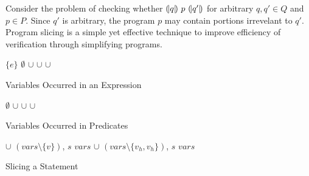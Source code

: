 
Consider the problem of checking whether ${(\!|}{q}{|\!)}~{p}~{(\!|}{q'}{|\!)}$ for
arbitrary $q, q' \in Q$ and $p \in P$. Since $q'$ is arbitrary, the
program $p$ may contain portions irrevelant to $q'$. Program slicing
is a simple yet effective technique to improve efficiency of
verification through simplifying programs.  

\begin{algorithm}
  \begin{algorithmic}[1]
        \Return $\{ e \}$
      \EndCase
        \Return $\emptyset$
      \EndCase
        \Return {}
      \EndCase
        \Return {} $\cup$ 
      \EndCase
        \Return {} $\cup$ 
      \EndCase
        \Return {} $\cup$ 
      \EndCase
        \Return {}
      \EndCase
    \EndMatch
    \EndFunction
  \end{algorithmic}
  \caption{Variables Occurred in an Expression}
\end{algorithm}

\begin{algorithm}
\begin{algorithmic}[1]
    \Case{$\top$}
      $\emptyset$
    \EndCase
      \Return {} $\cup$ 
    \EndCase
      \Return {} $\cup$ 
    \EndCase
      \Return {} $\cup$ 
    \EndCase
  \EndMatch
  \EndFunction
\end{algorithmic}
\caption{Variables Occurred in Predicates}
\end{algorithm}

\begin{algorithm}
  \begin{algorithmic}[1]
          {\Return {} $\cup$ $(\mathit{vars} \setminus \{
            v \})$, $s$}
          {\Return $\mathit{vars}$}
      \EndCase
          {\Return {} $\cup$ $(\mathit{vars} \setminus \{
            v_h, v_h \})$, $s$}
          {\Return $\mathit{vars}$}
      \EndCase
    \EndMatch
    \EndFunction
  \end{algorithmic}
  \caption{Slicing a Statement}
\end{algorithm}

